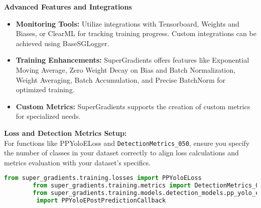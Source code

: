 \begin{enumerate}
    \textbf{Advanced Features and Integrations}\\
    \begin{itemize}
        \item \textbf{Monitoring Tools: } Utilize integrations with Tensorboard, Weights and Biases, or ClearML for tracking training progress. Custom integrations can be achieved using BaseSGLogger.
        \item \textbf{Training Enhancements: } SuperGradients offers features like Exponential Moving Average, Zero Weight Decay on Bias and Batch Normalization, Weight Averaging, Batch Accumulation, and Precise BatchNorm for optimized training.
        \item \textbf{Custom Metrics: } SuperGradients supports the creation of custom metrics for specialized needs.
    \end{itemize}
    
    \textbf{Loss and Detection Metrics Setup: }\\
    For functions like PPYoloELoss and \texttt{DetectionMetrics\_050}, ensure you specify the number of classes in your dataset correctly to align loss calculations and metrics evaluation with your dataset’s specifics.
    
    \begin{lstlisting}[language=Python]
        from super_gradients.training.losses import PPYoloELoss
        from super_gradients.training.metrics import DetectionMetrics_050
        from super_gradients.training.models.detection_models.pp_yolo_e 
         import PPYoloEPostPredictionCallback
        

\end{lstlisting}
\end{enumerate}
